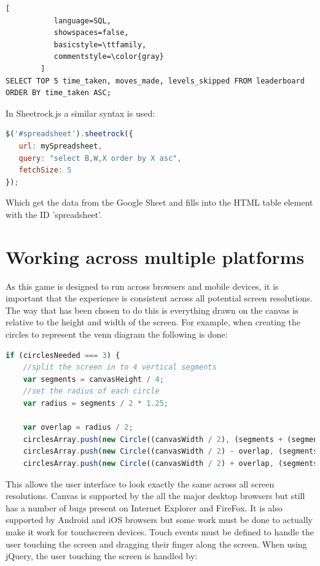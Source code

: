 \documentclass[12pt,a4paper]{report}
\begin{document}
\begin{lstlisting}[
           language=SQL,
           showspaces=false,
           basicstyle=\ttfamily,
           commentstyle=\color{gray}
        ]
SELECT TOP 5 time_taken, moves_made, levels_skipped FROM leaderboard ORDER BY time_taken ASC;
\end{lstlisting}

In Sheetrock.js a similar syntax is used:

\begin{lstlisting}[language=JavaScript]
$('#spreadsheet').sheetrock({
   url: mySpreadsheet,
   query: "select B,W,X order by X asc",
   fetchSize: 5
});
\end{lstlisting}

Which get the data from the Google Sheet and fills into the HTML table element with the ID 'spreadsheet'.

\section{Working across multiple platforms}
As this game is designed to run across browsers and mobile devices, it is important that the experience is consistent across all potential screen resolutions. The way that has been chosen to do this is everything drawn on the canvas is relative to the height and width of the screen. 
For example, when creating the circles to represent the venn diagram the following is done:

\begin{lstlisting}[language=JavaScript]
if (circlesNeeded === 3) {
    //split the screen in to 4 vertical segments
    var segments = canvasHeight / 4;
    //set the radius of each circle
    var radius = segments / 2 * 1.25;

    var overlap = radius / 2;
    circlesArray.push(new Circle((canvasWidth / 2), (segments + (segments * 2)) / 2 + (segments / 6), radius));
    circlesArray.push(new Circle((canvasWidth / 2) - overlap, (segments * 2 + (segments * 3)) / 2 - (segments / 6), radius));
    circlesArray.push(new Circle((canvasWidth / 2) + overlap, (segments * 2 + (segments * 3)) / 2 - (segments / 6), radius));

\end{lstlisting}

This allows the user interface to look exactly the same across all screen resolutions. 
Canvas is supported by the all the major desktop browsers but still has a number of bugs present on Internet Explorer and FireFox. It is also supported by Android and iOS browsers but some work must be done to actually make it work for touchscreen devices. Touch events must be defined to handle the user touching the screen and dragging their finger along the screen. When using jQuery, the user touching the screen is handled by:
\end{document}
